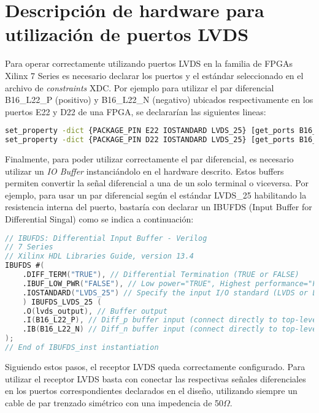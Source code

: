 \section{Descripción de hardware para utilización de puertos LVDS}

	Para operar correctamente utilizando puertos LVDS en la familia de FPGAs Xilinx 7 Series es necesario declarar los puertos y el estándar seleccionado en el archivo de \textit{constraints} XDC. Por ejemplo para utilizar el par diferencial B16\_L22\_P (positivo) y B16\_L22\_N (negativo) ubicados respectivamente en los puertos E22 y D22 de una FPGA, se declararían las siguientes lineas:

\begin{lstlisting}[language=bash, frame=single, basicstyle=\tiny]
set_property -dict {PACKAGE_PIN E22 IOSTANDARD LVDS_25} [get_ports B16_L22_P];
set_property -dict {PACKAGE_PIN D22 IOSTANDARD LVDS_25} [get_ports B16_L22_N];
\end{lstlisting}


	Finalmente, para poder utilizar correctamente el par diferencial, es necesario utilizar un \textit{IO Buffer} instanciándolo en el hardware descrito. Estos buffers permiten convertir la señal diferencial a una de un solo terminal o viceversa. Por ejemplo, para usar un par diferencial según el estándar LVDS\_25 habilitando la resistencia interna del puerto, bastaría con declarar un IBUFDS (Input Buffer for Differential Singal)\cite{Xilinx2012XilinxDesigns} como se indica a continuación:
	

\begin{lstlisting}[language=Verilog, frame=single, basicstyle=\tiny]
// IBUFDS: Differential Input Buffer - Verilog
// 7 Series
// Xilinx HDL Libraries Guide, version 13.4
IBUFDS #(
    .DIFF_TERM("TRUE"), // Differential Termination (TRUE or FALSE)
    .IBUF_LOW_PWR("FALSE"), // Low power="TRUE", Highest performance="FALSE"
    .IOSTANDARD("LVDS_25") // Specify the input I/O standard (LVDS or LVDS_25)
    ) IBUFDS_LVDS_25 (
    .O(lvds_output), // Buffer output
    .I(B16_L22_P), // Diff_p buffer input (connect directly to top-level port)
    .IB(B16_L22_N) // Diff_n buffer input (connect directly to top-level port)
);
// End of IBUFDS_inst instantiation
\end{lstlisting}

Siguiendo estos pasos, el receptor LVDS queda correctamente configurado. Para utilizar el receptor LVDS basta con conectar las respectivas señales diferenciales en los puertos correspondientes declarados en el diseño, utilizando siempre un cable de par trenzado simétrico con una impedencia de 50$\Omega$.